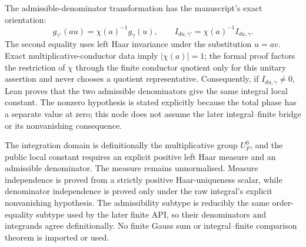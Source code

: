 \begin{definition}
The admissible-denominator transformation has the manuscript's exact
orientation:
\[
  g_{\gamma'}(au)=\chi(a)^{-1}g_\gamma(u),
  \qquad
  I_{du,\gamma'}=\chi(a)^{-1}I_{du,\gamma}.
\]
The second equality uses left Haar invariance under the substitution
$u=av$.  Exact multiplicative-conductor data imply
$|\chi(a)|=1$; the formal proof factors the restriction of $\chi$ through
the finite conductor quotient only for this unitary assertion and never
chooses a quotient representative.  Consequently, if
$I_{du,\gamma}\ne0$, Lean proves that the two admissible denominators give
the same integral local constant.  The nonzero hypothesis is stated
explicitly because the total phase has a separate value at zero; this node
does not assume the later integral--finite bridge or its nonvanishing
consequence.

\leanok
{}
\FormalizationContract The integration domain is definitionally the
multiplicative group $U_F^0$, and the public local constant requires an
explicit positive left Haar measure and an admissible denominator.  The
measure remains unnormalised.  Measure independence is proved from a
strictly positive Haar-uniqueness scalar, while denominator independence is
proved only under the raw integral's explicit nonvanishing hypothesis.
The admissibility subtype is reducibly the same order-equality subtype used
by the later finite API, so their denominators and integrands agree
definitionally.
No finite Gauss sum or integral--finite comparison theorem is imported or
used.
\end{definition}
